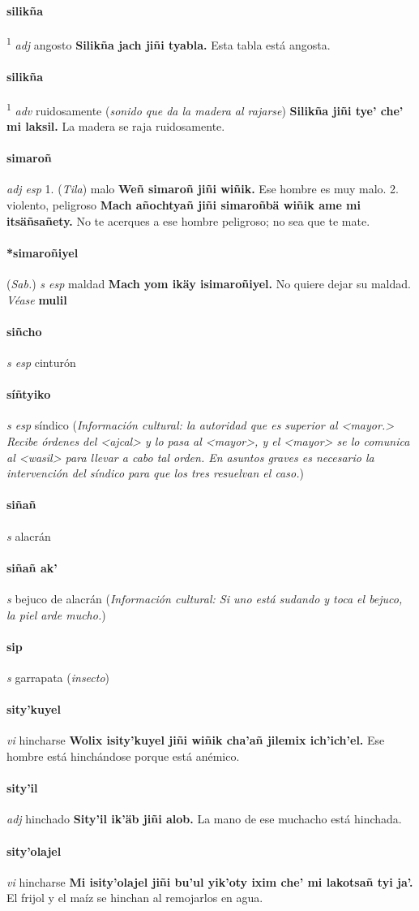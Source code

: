 \documentclass{scrbook}
\newcommand{\entry}[1]{\paragraph{#1}}
\newcommand{\onedefinition}[1]{#1.}
\newcommand{\defsuperscript}[1]{\textsuperscript{1}}
\newcommand{\partofspeech}[1]{\textit{#1}}
\newcommand{\spanishtranslation}[1]{#1}
\newcommand{\clarification}[1]{(\textit{#1})}
\newcommand{\cholexample}[1]{\textbf{#1}}
\newcommand{\exampletranslation}[1]{#1}
\newcommand{\alsosee}[1]{\\\textit{Véase} \textbf{#1}}
\newcommand{\relevantdialect}[1]{(\textit{#1})}
\newcommand{\culturalinformation}[1]{(\textit{#1})}
\begin{document}
\begin{multicols}{2}
\entry{silikña}
\defsuperscript{1}
\partofspeech{adj}
\spanishtranslation{angosto}
\cholexample{Silikña jach jiñi tyabla.}
\exampletranslation{Esta tabla está angosta.}

\entry{silikña}
\defsuperscript{2}
\partofspeech{adv}
\spanishtranslation{ruidosamente}
\clarification{sonido que da la madera al rajarse}
\cholexample{Silikña jiñi tye' che' mi laksil.}
\exampletranslation{La madera se raja ruidosamente.}

\entry{simaroñ}
\partofspeech{adj esp}
\onedefinition{1}
\relevantdialect{Tila}
\spanishtranslation{malo}
\cholexample{Weñ simaroñ jiñi wiñik.}
\exampletranslation{Ese hombre es muy malo.}
\onedefinition{2}
\spanishtranslation{violento, peligroso}
\cholexample{Mach añochtyañ jiñi simaroñbä wiñik ame mi itsäñsañety.}
\exampletranslation{No te acerques a ese hombre peligroso; no sea que te mate.}

\entry{*simaroñiyel}
\relevantdialect{Sab.}
\partofspeech{s esp}
\spanishtranslation{maldad}
\cholexample{Mach yom ikäy isimaroñiyel.}
\exampletranslation{No quiere dejar su maldad.}
\alsosee{mulil}

\entry{siñcho}
\partofspeech{s esp}
\spanishtranslation{cinturón}

\entry{síñtyiko}
\partofspeech{s esp}
\spanishtranslation{síndico}
\culturalinformation{Información cultural: la autoridad que es superior al <mayor.> Recibe órdenes del <ajcal> y lo pasa al <mayor>, y el <mayor> se lo comunica al <wasil> para llevar a cabo tal orden. En asuntos graves es necesario la intervención del síndico para que los tres resuelvan el caso.}

\entry{siñañ}
\partofspeech{s}
\spanishtranslation{alacrán}

\entry{siñañ ak'}
\partofspeech{s}
\spanishtranslation{bejuco de alacrán}
\culturalinformation{Información cultural: Si uno está sudando y toca el bejuco, la piel arde mucho.}

\entry{sip}
\partofspeech{s}
\spanishtranslation{garrapata}
\clarification{insecto}

\entry{sity'kuyel}
\partofspeech{vi}
\spanishtranslation{hincharse}
\cholexample{Wolix isity'kuyel jiñi wiñik cha'añ jilemix ich'ich'el.}
\exampletranslation{Ese hombre está hinchándose porque está anémico.}

\entry{sity'il}
\partofspeech{adj}
\spanishtranslation{hinchado}
\cholexample{Sity'il ik'äb jiñi alob.}
\exampletranslation{La mano de ese muchacho está hinchada.}

\entry{sity'olajel}
\partofspeech{vi}
\spanishtranslation{hincharse}
\cholexample{Mi isity'olajel jiñi bu'ul yik'oty ixim che' mi lakotsañ tyi ja'.}
\exampletranslation{El frijol y el maíz se hinchan al remojarlos en agua.}


\end{multicols}
\end{document}
